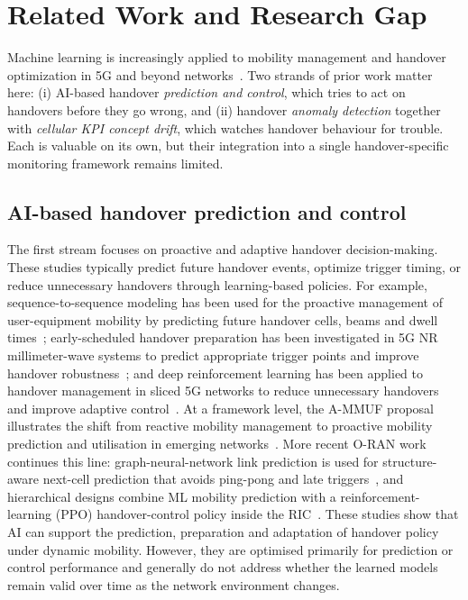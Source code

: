 \chapter{Related Work and Research Gap}
\label{ch:relatedwork}

Machine learning is increasingly applied to mobility management and handover
optimization in 5G and beyond networks~\cite{hoMgmtSurvey2025}. Two strands of
prior work matter here: (i) AI-based handover \emph{prediction and control},
which tries to act on handovers before they go wrong, and (ii) handover
\emph{anomaly detection} together with \emph{cellular KPI concept drift}, which
watches handover behaviour for trouble. Each is valuable on its own, but their integration into a
single handover-specific monitoring framework remains limited.

\section{AI-based handover prediction and control}
\label{subsec:rw-prediction}

The first stream focuses on proactive and adaptive handover decision-making.
These studies typically predict future handover events, optimize trigger
timing, or reduce unnecessary handovers through learning-based policies. For
example, sequence-to-sequence modeling has been used for the proactive
management of user-equipment mobility by predicting future handover cells, beams
and dwell times~\cite{seq2seqMob2022}; early-scheduled handover preparation has
been investigated in 5G NR millimeter-wave systems to predict appropriate
trigger points and improve handover robustness~\cite{eshop2024}; and deep
reinforcement learning has been applied to handover management in sliced 5G
networks to reduce unnecessary handovers and improve adaptive
control~\cite{slicedDRL2024}. At a framework level, the A-MMUF proposal
illustrates the shift from reactive mobility management to proactive mobility
prediction and utilisation in emerging networks~\cite{ammuf2022}. More recent
O-RAN work continues this line: graph-neural-network link prediction is used for
structure-aware next-cell prediction that avoids ping-pong and late
triggers~\cite{gnnOranMob2025}, and hierarchical designs combine ML mobility
prediction with a reinforcement-learning (PPO) handover-control policy inside the
RIC~\cite{multimodalHO2026}. These studies show that AI can support the
prediction, preparation and adaptation of handover policy under dynamic
mobility. However, they are optimised primarily for prediction or control
performance and generally do not address whether the learned models remain valid
over time as the network environment changes.

